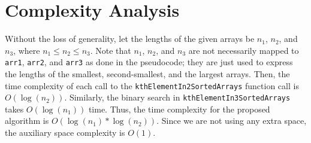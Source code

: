 \documentclass{article}
\begin{document}
\section{Complexity Analysis}
Without the loss of generality, let the lengths of the given arrays be $n_1$, $n_2$, and $n_3$, where $n_1 \leq n_2 \leq n_3$. Note that $n_1$, $n_2$, and $n_3$ are not necessarily mapped to \texttt{arr1}, \texttt{arr2}, and \texttt{arr3} as done in the pseudocode; they are just used to express the lengths of the smallest, second-smallest, and the largest arrays. Then, the time complexity of each call to the \texttt{kthElementIn2SortedArrays} function call is $O(\log(n_2))$. Similarly, the binary search in \texttt{kthElementIn3SortedArrays} takes $O(\log(n_1))$ time. \newline \newline
Thus, the time complexity for the proposed algorithm is $O(\log(n_1) * \log(n_2))$. \newline
Since we are not using any extra space, the auxiliary space complexity is $O(1)$.
\end{document}
